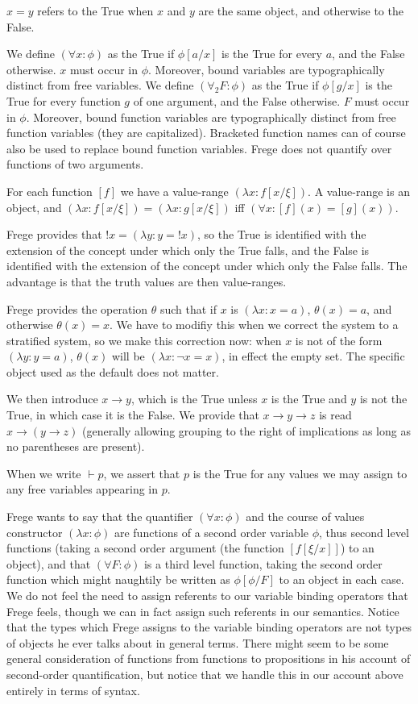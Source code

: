 \documentclass{article}
\begin{document}
$x=y$ refers to the True when $x$ and $y$ are the same object, and otherwise to the False.

We define $(\forall x:\phi)$ as the True if $\phi[a/x]$ is the True for every $a$, and the False otherwise.  $x$ must occur in $\phi$.  Moreover, bound variables are typographically distinct from free variables.  We define $(\forall_2F:\phi)$ as the True if $\phi[g/x]$ is the True for every function $g$ of one argument, and the False otherwise.  $F$ must occur in $\phi$.  Moreover, bound function variables are typographically distinct from free function variables (they are capitalized).  Bracketed function names can of course also be used to replace bound function variables.  Frege does not quantify over functions of two arguments.

For each function $[f]$ we have a value-range $(\lambda x:f[x/\xi])$.  A value-range is an object, and $(\lambda x:f[x/\xi])=(\lambda x:g[x/\xi])$ iff $(\forall x:[f](x)=[g](x))$.

Frege provides that $!x = (\lambda y:y=!x)$, so the True is identified with the extension of the concept under which only the True falls, and the False is identified with the extension of the concept under which only the False falls.  The advantage is that the truth values are then value-ranges.

Frege provides the operation $\theta$ such that if $x$ is $(\lambda x:x=a)$, $\theta(x) = a$, and otherwise $\theta(x)=x$.   We have to modifiy this when we correct the system
to a stratified system, so we make this correction now:  when $x$ is not of the form $(\lambda y:y=a)$, $\theta(x)$ will be $(\lambda x:\neg x=x)$, in effect the empty set.  The specific object used as the default does not matter.

We then introduce $x \rightarrow y$, which is the True unless $x$ is the True and $y$ is not the True, in which case it is the False.  We provide that $x \rightarrow y \rightarrow z$ is read
$x \rightarrow (y \rightarrow z)$ (generally allowing grouping to the right of implications as long as no parentheses are present).

When we write $\vdash p$, we assert that $p$ is the True for any values we may assign to any free variables appearing in $p$.

Frege wants to say that the quantifier $(\forall x:\phi)$ and the course of values constructor $(\lambda x:\phi)$ are functions of a second order variable $\phi$, thus second level functions (taking a second order argument (the function $[f[\xi/x]]$) to an object), and that $(\forall F:\phi)$ is a third level function, taking the second order function which might
naughtily be written as $\phi[\phi/F]$ to an object in each case.   We do not feel the need to assign referents to our variable binding operators that Frege feels, though we can in fact assign such referents in our semantics.  Notice that the types which Frege assigns to the variable binding operators are not types of objects he ever talks about in general terms.  There might seem to be some general consideration of functions from functions to propositions in his account of second-order quantification, but notice that we handle this in our account above entirely in terms of syntax.
\end{document}
